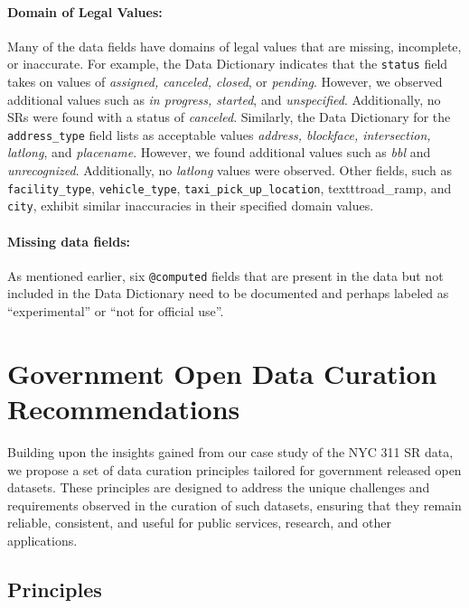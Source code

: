 \documentclass[linenumber]{jdsart}
\begin{document}
\paragraph{Domain of Legal Values:} Many of the data fields have
domains of legal values that are missing, incomplete, or inaccurate. For 
example, the Data Dictionary indicates 
that the \texttt{status} field takes on values of \textit{assigned, canceled, 
closed}, or \textit{pending}. However, we observed additional values 
such as \textit{in progress, started}, and \textit{unspecified}. Additionally, 
no SRs were found with a status of \textit{canceled}. Similarly, 
the Data Dictionary for the \texttt{address\_type} field lists as acceptable
values \textit{address, blockface, intersection, latlong}, and 
\textit{placename}. However, we found additional values such 
as \textit{bbl} and \textit{unrecognized}. Additionally, no 
\textit{latlong} values were observed. Other fields, such 
as \texttt{facility\_type}, \texttt{vehicle\_type}, \texttt{taxi\_pick\_up\_location},
texttt{road\_ramp}, and \texttt{city}, exhibit similar inaccuracies 
in their specified domain values.

\paragraph{Missing data fields:} As mentioned earlier, six \texttt{@computed} 
fields that are present in the data but not included in 
the Data Dictionary need to be documented and perhaps 
labeled as ``experimental'' or ``not for official use''.


\section{Government Open Data Curation Recommendations}
\label{sec:recommendations}
Building upon the insights gained from our case study of the 
NYC 311 SR data, we propose a set of data 
curation principles tailored for government released open datasets. 
These principles are designed to address the unique challenges 
and requirements observed in the curation of such datasets, 
ensuring that they remain reliable, consistent, and useful for 
public services, research, and other applications.

\subsection{Principles}
\end{document}
